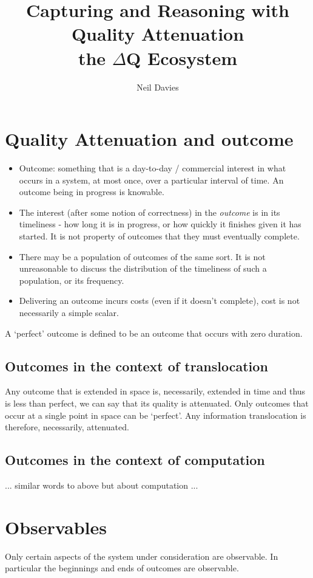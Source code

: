 \documentclass[11pt,a4paper]{article}
\title{Capturing and Reasoning with Quality Attenuation \\ the $\Delta$Q Ecosystem}
\author{Neil Davies}
\begin{document}
\maketitle
\tableofcontents
\section{Quality Attenuation and outcome}
\begin{itemize}
\item Outcome: something that is a day-to-day / commercial interest in
  what occurs in a system, at most once, over a particular interval of time.
  An outcome being in progress is knowable.
\item The interest (after some notion of correctness) in the \emph{outcome}
  is in its timeliness - how long it is in progress, or how quickly it finishes
  given it has started. It is not property of outcomes that they must 
  eventually complete. 
\item There may be a population of outcomes of the same sort. It is not 
  unreasonable to discuss the distribution of the timeliness of such a population, 
  or its frequency.
\item Delivering an outcome incurs costs (even if it doesn't complete), 
  cost is not necessarily a simple scalar. 
\end{itemize}

A `perfect' outcome is defined to be an outcome that occurs with zero duration. 

\subsection{Outcomes in the context of translocation}
Any outcome that is extended in space is, necessarily, extended in time and
thus is less than perfect, we can say that its quality is attenuated. 
Only outcomes that occur at a single point in space can be `perfect'. 
Any information translocation is therefore, necessarily, attenuated.

\subsection{Outcomes in the context of computation}
... similar words to above but about computation ...


\section{Observables}
Only certain aspects of the system under consideration are observable. In particular the
beginnings and ends of outcomes are observable.
\end{document}
